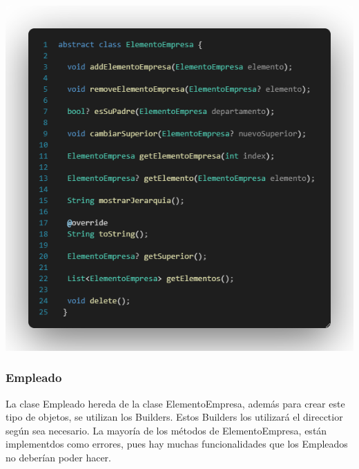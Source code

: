 \documentclass[
]{article}
\begin{document}
\includegraphics[]{imagenes/ElementoEmpresa.png}

\subsubsection{Empleado}\label{empleado}

La clase Empleado hereda de la clase ElementoEmpresa, además para crear
este tipo de objetos, se utilizan los Builders. Estos Builders los
utilizará el direcctior según sea necesario. La mayoría de los métodos
de ElementoEmpresa, están implementdos como errores, pues hay muchas
funcionalidades que los Empleados no deberían poder hacer.
\end{document}
